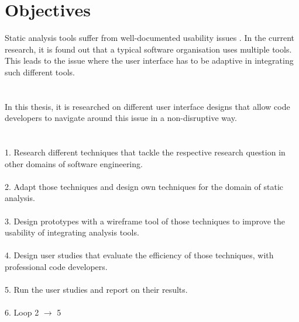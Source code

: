 \chapter{Objectives}
\label{ch:objectives}

Static analysis tools suffer from well-documented usability issues \cite{CB16,JSMB13}. In the current research, it is found out that a typical software organisation uses multiple tools. This leads to the issue where the user interface has to be adaptive in integrating such different tools. \\ \\ \\
In this thesis, it is researched on different user interface designs that allow code developers to navigate around
this issue in a non-disruptive way. \\ \\ \\
1. Research different techniques that tackle the respective research question in other domains of software
engineering. \\ \\
2. Adapt those techniques and design own techniques for the domain of static analysis. \\ \\
3. Design prototypes with a wireframe tool \cite{B} of those techniques to improve the usability of integrating analysis tools. \\ \\
4. Design user studies that evaluate the efficiency of those techniques, with professional code developers. \\ \\
5. Run the user studies and report on their results. \\ \\
6. Loop 2 $\rightarrow$ 5 

\let\cleardoublepage\clearpage